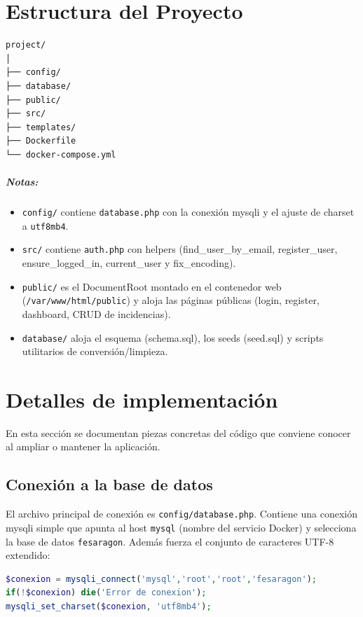 \documentclass[12pt,letterpaper,oneside]{extreport}
\begin{document}
\chapter{Estructura del Proyecto}

\begin{lstlisting}
project/
│
├── config/
├── database/
├── public/
├── src/
├── templates/
├── Dockerfile
└── docker-compose.yml
\end{lstlisting}

\paragraph{Notas:}
\begin{itemize}
    \item \texttt{config/} contiene \texttt{database.php} con la conexión mysqli y el ajuste de charset a \texttt{utf8mb4}.
    \item \texttt{src/} contiene \texttt{auth.php} con helpers (find\_user\_by\_email, register\_user, ensure\_logged\_in, current\_user y fix\_encoding).
    \item \texttt{public/} es el DocumentRoot montado en el contenedor web (\texttt{/var/www/html/public}) y aloja las páginas públicas (login, register, dashboard, CRUD de incidencias).
    \item \texttt{database/} aloja el esquema (schema.sql), los seeds (seed.sql) y scripts utilitarios de conversión/limpieza.
\end{itemize}

\chapter{Detalles de implementación}
En esta sección se documentan piezas concretas del código que conviene conocer al ampliar o mantener la aplicación.

\section{Conexión a la base de datos}
El archivo principal de conexión es \texttt{config/database.php}. Contiene una conexión mysqli simple que apunta al host \texttt{mysql} (nombre del servicio Docker) y selecciona la base de datos \texttt{fesaragon}. Además fuerza el conjunto de caracteres UTF-8 extendido:
\begin{lstlisting}[language=PHP]
$conexion = mysqli_connect('mysql','root','root','fesaragon');
if(!$conexion) die('Error de conexion');
mysqli_set_charset($conexion, 'utf8mb4');
\end{lstlisting}
\end{document}
